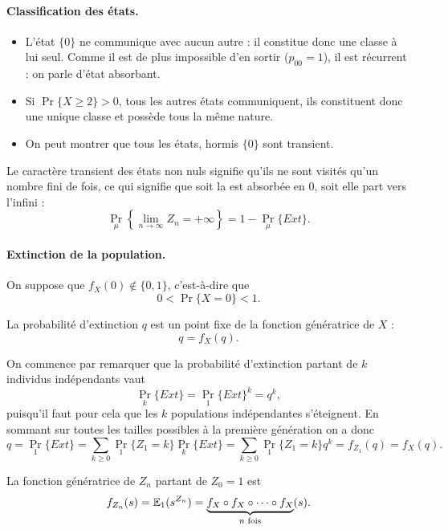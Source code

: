 \paragraph*{Classification des états.} 
\begin{itemize}
 \item L'état $\{0\}$ ne communique avec aucun autre : il constitue donc une classe à lui seul. Comme il est de plus impossible d'en sortir ($p_{00} = 1$), il est récurrent : on parle d'état absorbant.
 \item Si $\Pr\{X \geq 2\} > 0$, tous les autres états communiquent, ils constituent donc une unique classe et possède tous la même nature.
 \item On peut montrer que tous les états, hormis $\{0\}$ sont transient.
\end{itemize}

Le caractère transient des états non nuls signifie qu'ils ne sont visités qu'un nombre fini de fois, ce qui signifie que soit la \cM est absorbée en 0, soit elle part vers l'infini : 
$$
\Pr_\mu\left\{ \lim_{n \to \infty} Z_n = + \infty\right\} = 1 - \Pr_\mu\{Ext\}.
$$

\paragraph*{Extinction de la population.} 
On suppose que $f_X(0) \notin \{0, 1\}$, c'est-à-dire que 
$$
0 < \Pr\{X = 0\} < 1.
$$

\begin{proposition}
  La probabilité d'extinction $q$ est un point fixe de la fonction génératrice de $X$ :
  $$
  q = f_X(q).
  $$
\end{proposition}

\proof
On commence par remarquer que la probabilité d'extinction partant de $k$ individus indépendants vaut
$$
\Pr_k\{Ext\} = \Pr_1\{Ext\}^k = q^k,
$$
puisqu'il faut pour cela que les $k$ populations indépendantes s'éteignent. En sommant sur toutes les tailles possibles à la première génération on a donc
$$
q 
= \Pr_1\{Ext\} 
= \sum_{k \geq 0} \Pr_1\{Z_1 = k\} \Pr_k\{Ext\}
= \sum_{k \geq 0} \Pr_1\{Z_1 = k\} q^k
= f_{Z_1}(q)
= f_X(q).
$$

\begin{proposition} \label{prop:fonctionGeneratriceZn}
  La fonction génératrice de $Z_n$ partant de $Z_0 = 1$ est
  $$
  f_{Z_n}(s) = \operatorname{\mathbb{E}}_1(s^{Z_n}) = \underset{n \text{ fois}}{\underbrace{f_X \circ f_X \circ \dots \circ f_X}}(s).
  $$
\end{proposition}


